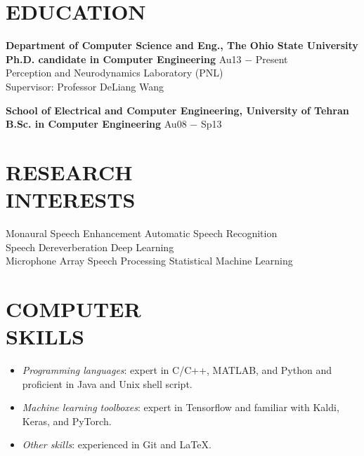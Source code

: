 \documentclass[margin, 10pt]{res}
\begin{document}
\begin{resume}

\section{EDUCATION}
\textbf{Department of Computer Science and Eng., The Ohio State University }  \\
\textbf{Ph.D. candidate in Computer Engineering} \hfill {\footnotesize Au13 $-$ Present} \\
Perception and Neurodynamics Laboratory (PNL)\\
Supervisor: Professor DeLiang Wang

\textbf{School of Electrical and Computer Engineering, University of Tehran}\\
\textbf{B.Sc. in Computer Engineering} \hfill {\footnotesize Au08 $-$ Sp13} 

\section{RESEARCH\\INTERESTS}
Monaural Speech Enhancement    \hspace{0.84in}   Automatic Speech Recognition\\ 
Speech Dereverberation     \hspace{1.32in}    Deep Learning\\ 
Microphone Array Speech Processing   \hspace{0.5in} Statistical Machine Learning

\section{COMPUTER \\ SKILLS}
\begin{itemize}
\item \textit{Programming languages}: expert in C/C++, MATLAB, and Python and proficient in Java and Unix shell script.
\item \textit{Machine learning toolboxes}: expert in Tensorflow and familiar with Kaldi, Keras, and PyTorch.
\item \textit{Other skills}: experienced in Git and LaTeX.
\end{itemize}


\end{resume}
\end{document}
